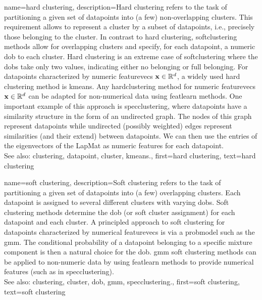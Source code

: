 {name={hard clustering}, 
	description={Hard \gls{clustering} 
		refers to the task of partitioning a given set of \glspl{datapoint} 
		into (a few) non-overlapping \glspl{cluster}. This requirement 
		allows to represent a \gls{cluster} by a subset of \glspl{datapoint}, 
		i.e., precisely those belonging to the \gls{cluster}. In contrast to 
		hard \gls{clustering}, \gls{softclustering} methods allow for overlapping 
		\glspl{cluster} and specify, for each \gls{datapoint}, a numeric \gls{dob} 
		to each \gls{cluster}. Hard \gls{clustering} is an extreme case of \gls{softclustering} 
		where the \glspl{dob} take only two values, indicating either no belonging or 
		full belonging. 
		For \glspl{datapoint} characterized by numeric \glspl{featurevec} ${\bf x} \in \mathbb{R}^{d}$, 
		a widely used hard \gls{clustering} method is \gls{kmeans}. Any 
		\gls{hardclustering} method for numeric \glspl{featurevec} ${\bf x} \in \mathbb{R}^{d}$ can 
		be adapted for non-numerical \gls{data} using \gls{featlearn} methods. 
		One important example of this approach is \gls{specclustering}, where 
		\glspl{datapoint} have a similarity structure in the form of an undirected 
		\gls{graph}. The nodes of this \gls{graph} represent \glspl{datapoint} 
		while undirected (possibly weighted) edges represent similarities (and their 
		extend) between \glspl{datapoint}. We can then use the entries of the 
		\glspl{eigenvector} of the \gls{LapMat} as numeric \glspl{feature} for 
		each \gls{datapoint}. 
		\\
		See also: \gls{clustering}, \gls{datapoint}, \gls{cluster}, \gls{kmeans}.},
	first={hard clustering},
	text={hard clustering} 
}
	
{name={soft clustering}, 
	description={Soft \gls{clustering} 
		refers to the task of partitioning a given set of \glspl{datapoint} into (a few) 
		overlapping \glspl{cluster}. Each \gls{datapoint} is assigned to several different 
		\glspl{cluster} with varying \glspl{dob}. Soft \gls{clustering} methods determine the 
		\gls{dob} (or soft \gls{cluster} assignment) for each \gls{datapoint} and each \gls{cluster}.
		A principled approach to soft \gls{clustering} for \glspl{datapoint} characterized by 
		numerical \glspl{featurevec} is via a \gls{probmodel} such as the \gls{gmm}. 
		The conditional \gls{probability} of a \gls{datapoint} belonging to a specific mixture 
		component is then a natural choice for the \gls{dob}. \Gls{gmm} soft \gls{clustering} 
		methods can be applied to non-numeric \gls{data} by using \gls{featlearn} methods 
		to provide numerical \glspl{feature} (such as in \gls{specclustering}). 
				\\
		See also: \gls{clustering}, \gls{cluster}, \gls{dob}, \gls{gmm}, \gls{specclustering}.},
	first={soft clustering},
	text={soft clustering} 
}

